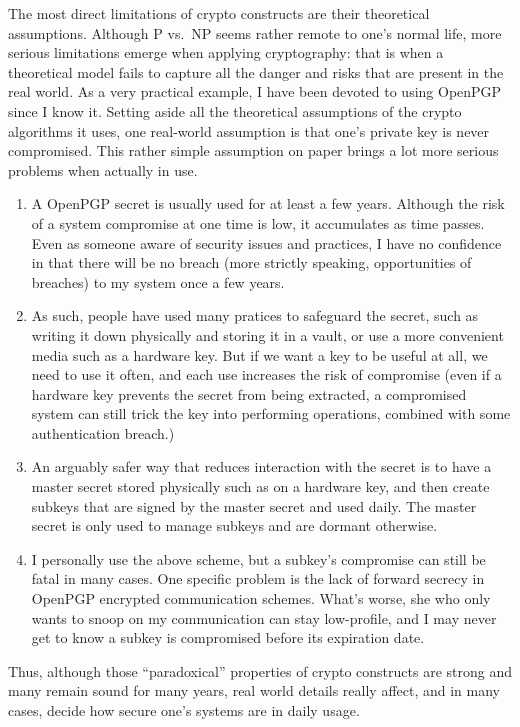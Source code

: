 \documentclass[10pt]{article}
\begin{document}
The most direct limitations of crypto constructs are their theoretical assumptions.
Although P vs.\ NP seems rather remote to one's normal life,  more
serious limitations emerge when applying cryptography: that is when a
theoretical model fails to capture all the danger and risks that are present in
the real world. As a very practical example, I have been devoted
to using OpenPGP since I know it. Setting aside all the theoretical
assumptions of the crypto algorithms it uses, one real-world assumption is that
one's private key is never compromised. This rather simple assumption on paper
brings a lot more serious problems when actually in use.
\begin{enumerate}
\item A OpenPGP secret is usually used for at least a few years. Although the
	risk of a system compromise at one time is low, it accumulates as time
	passes.  Even as someone aware of security issues and practices, I have no
	confidence in that there will be no breach (more strictly speaking,
	opportunities of breaches) to my system once a few years. 
\item As such, people have used many pratices to safeguard the secret, such as
	writing it down physically and storing it in a vault, or use a more
	convenient media such as a hardware key. But if we want a key to be useful
	at all, we need to use it often, and each use increases the risk of
	compromise (even if a hardware key prevents the secret from being
	extracted, a compromised system can still trick the key into performing
	operations, combined with some authentication breach.) 
\item An arguably safer way that reduces interaction with the secret is to have
	a master secret stored physically such as on a hardware key, and then create
	subkeys that are signed by the master secret and used daily. The master
	secret is only used to manage subkeys and are dormant otherwise.
\item I personally use the above scheme, but a subkey's compromise can still be
	fatal in many cases. One specific problem is the lack of forward secrecy in
	OpenPGP encrypted communication schemes. What's worse, she who only wants
	to snoop on my communication can stay low-profile, and I may never get to
	know a subkey is compromised before its expiration date.
\end{enumerate}
Thus, although those ``paradoxical'' properties of crypto constructs are
strong and many remain sound for many years, real world details really affect,
and in many cases, decide how secure one's systems are in daily usage. 
\end{document}
